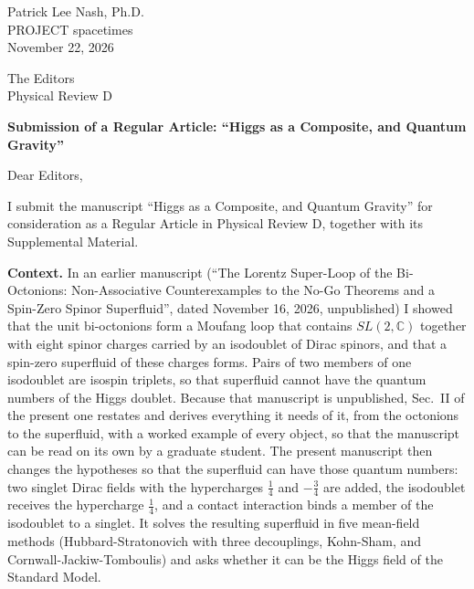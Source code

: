 \documentclass[11pt]{article}
\begin{document}
\begin{flushright}
Patrick Lee Nash, Ph.D.\\
PROJECT spacetimes\\
November 22, 2026
\end{flushright}

The Editors\\
Physical Review D

\textbf{Submission of a Regular Article: ``Higgs as a Composite, and Quantum Gravity''}

Dear Editors,

I submit the manuscript ``Higgs as a Composite, and Quantum Gravity'' for consideration as a Regular Article in
Physical Review D, together with its Supplemental Material.

\textbf{Context.} In an earlier manuscript (``The Lorentz Super-Loop of the Bi-Octonions: Non-Associative Counterexamples
to the No-Go Theorems and a Spin-Zero Spinor Superfluid'', dated November 16, 2026, unpublished) I showed that the unit
bi-octonions form a Moufang loop that contains $SL(2,\mathbb C)$ together with eight spinor charges carried by an
isodoublet of Dirac spinors, and that a spin-zero superfluid of these charges forms. Pairs of two members of one
isodoublet are isospin triplets, so that superfluid cannot have the quantum numbers of the Higgs doublet. Because that
manuscript is unpublished, Sec.~II of the present one restates and derives everything it needs of it, from the octonions
to the superfluid, with a worked example of every object, so that the manuscript can be read on its own by a graduate
student. The present manuscript then changes the hypotheses so that the superfluid can have those quantum numbers: two singlet Dirac fields with the hypercharges $\frac14$ and
$-\frac34$ are added, the isodoublet receives the hypercharge $\frac14$, and a contact interaction binds a member of the
isodoublet to a singlet. It solves the resulting superfluid in five mean-field methods (Hubbard-Stratonovich with three
decouplings, Kohn-Sham, and Cornwall-Jackiw-Tomboulis) and asks whether it can be the Higgs field of the Standard Model.
\end{document}

